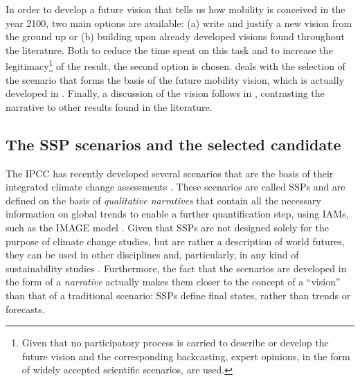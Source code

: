 In order to develop a future vision that tells us how mobility is conceived in the year 2100, two main options are available: (a) write and justify a new vision from the ground up or (b) building upon already developed visions found throughout the literature. Both to reduce the time spent on this task and to increase the legitimacy\footnote{Given that no participatory process is carried to describe or develop the future vision and the corresponding backcasting, expert opinions, in the form of widely accepted scientific scenarios, are used.} of the result, the second option is chosen.  deals with the selection of the scenario that forms the basis of the future mobility vision, which is actually developed in . Finally, a discussion of the vision follows in , contrasting the narrative to other results found in the literature.

\subsection{The SSP scenarios and the selected candidate}
\label{ss:results:ssp-scenarios-candidate}
The \gls{IPCC} has recently developed several scenarios that are the basis of their integrated climate change assessments \parencite{oneill2017_roadsaheadNarratives,vuuren2017_Energylanduse,fricko2017_markerquantificationShared,fujimori2017_SSP3AIMimplementation,calvin2017_SSP4worlddeepening,kriegler2017_Fossilfueleddevelopment}. These scenarios are called \glspl{SSP} and are defined on the basis of \textit{qualitative narratives} that contain all the necessary information on global trends to enable a further quantification step, using \glspl{IAM}, such as the IMAGE model \parencite{vuuren2017_Energylanduse}. Given that SSPs are not designed solely for the purpose of climate change studies, but are rather a description of world futures, they can be used in other disciplines and, particularly, in any kind of sustainability studies \parencite{oneill2017_roadsaheadNarratives}. Furthermore, the fact that the scenarios are developed in the form of a \textit{narrative} actually makes them closer to the concept of a ``vision'' than that of a traditional scenario: SSPs define final states, rather than trends or forecasts.

